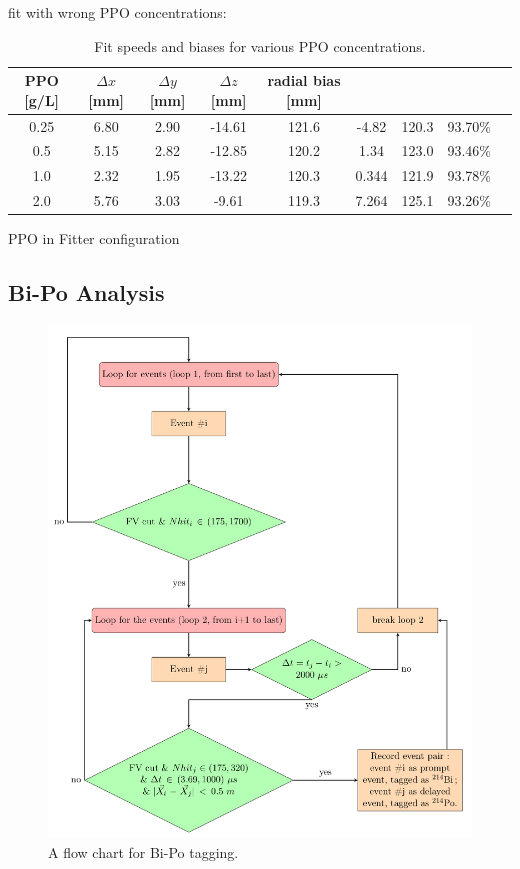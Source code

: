 fit with wrong PPO concentrations:  
\begin{table}[ht]
	\centering
	\caption{\label{partial_bias1} Fit speeds and biases for various PPO concentrations.}	
	{\centering
		\begin{tabular*}{150mm}{c@{\extracolsep{\fill}}cccccccc}
			\toprule 
			PPO [g/L] & $\Delta x$ [mm]& $\Delta y$ [mm]& $\Delta z$ [mm] & radial bias [mm] &  & &\\
			\midrule
			0.25 & 6.80& 2.90& -14.61& 121.6& -4.82& 120.3& 93.70\%\\
			0.5  & 5.15& 2.82& -12.85 &120.2 &1.34 &123.0 &93.46\% \\
			1.0 &2.32 &1.95 &-13.22& 120.3& 0.344& 121.9 &93.78\% \\
			2.0 &5.76& 3.03& -9.61& 119.3& 7.264 &125.1& 93.26\% \\
			\bottomrule	
		\end{tabular*}
	}
\end{table}



PPO in Fitter
configuration


\subsection{Bi-Po Analysis}

\begin{figure}[!htb]
	\centering
	\includegraphics[width=15cm]{flowchart_latex.pdf}
	\caption{A flow chart for Bi-Po tagging.}
	\label{biPo_flowchart}
\end{figure}




